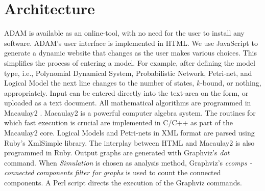 \documentclass[11pt]{amsart}
\begin{document}
\section{Architecture}
ADAM is available as an online-tool, with no need for the user to install any software. ADAM's user interface is implemented in HTML. We use JavaScript to generate a dynamic website that changes as the user makes various choices. This simplifies the process of entering a model. For example, after defining the model type, i.e., Polynomial Dynamical System, Probabilistic Network, Petri-net, and Logical Model the next line changes to the number of states, $k$-bound, or nothing, appropriately. Input can be entered directly into the text-area on the form, or uploaded as a text document.
All mathematical algorithms are programmed in Macaulay2 \cite{M2}. Macaulay2 is a powerful computer algebra system. The routines for which fast execution is crucial are implemented in C/C++ as part of the Macaulay2 core. Logical Models and Petri-nets in XML format are parsed using Ruby's XmlSimple library. The interplay between HTML and Macaulay2 is also programmed in Ruby.
Output graphs are generated with Graphviz's {\it dot} command. When {\it Simulation} is chosen as analysis method, Graphviz's {\it ccomps - connected components filter for graphs} is used to count the connected components. A Perl script directs the execution of the Graphviz commands.
\end{document}
